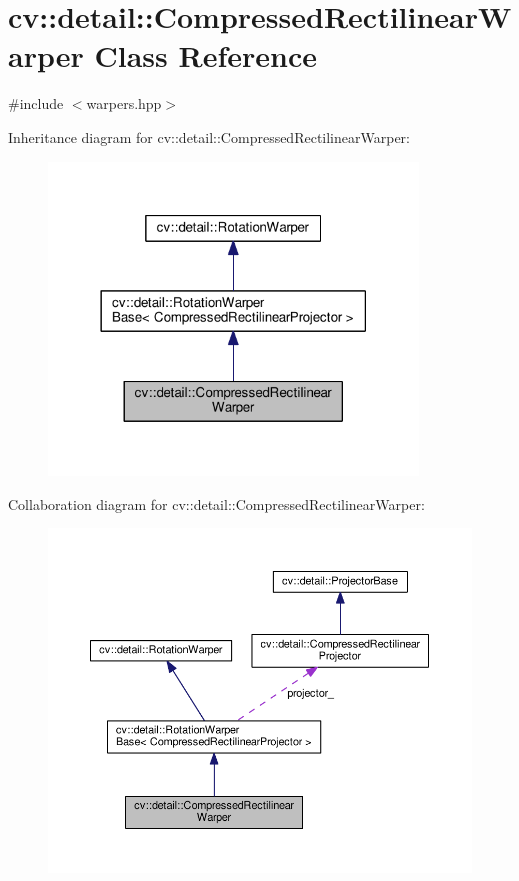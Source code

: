 \hypertarget{classcv_1_1detail_1_1CompressedRectilinearWarper}{\section{cv\-:\-:detail\-:\-:Compressed\-Rectilinear\-Warper Class Reference}
\label{classcv_1_1detail_1_1CompressedRectilinearWarper}
}


{\ttfamily \#include $<$warpers.\-hpp$>$}



Inheritance diagram for cv\-:\-:detail\-:\-:Compressed\-Rectilinear\-Warper\-:\nopagebreak
\begin{figure}[H]
\begin{center}
\leavevmode
\includegraphics[width=278pt]{classcv_1_1detail_1_1CompressedRectilinearWarper__inherit__graph}
\end{center}
\end{figure}


Collaboration diagram for cv\-:\-:detail\-:\-:Compressed\-Rectilinear\-Warper\-:\nopagebreak
\begin{figure}[H]
\begin{center}
\leavevmode
\includegraphics[width=350pt]{classcv_1_1detail_1_1CompressedRectilinearWarper__coll__graph}
\end{center}
\end{figure}
